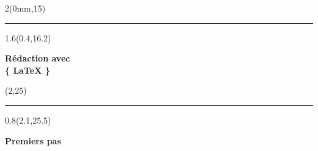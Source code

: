 \begin{frame}[plain]
  \begin{textblock*}{2\TPHorizModule}(0mm,15\TPVertModule)
    \textcolor{white}{\rule{\linewidth}{10\TPVertModule}}
  \end{textblock*}

  \begin{textblock*}{1.6\TPHorizModule}(0.4\TPHorizModule,16.2\TPVertModule)
    \raggedright%
    \titles\bfseries
    \fontsize{20}{20}\selectfont
    Rédaction avec \\
    \rmfamily\mdseries
    \fontsize{22.5}{22.5}\selectfont
    \fontsize{40}{40}\selectfont%
    \{%
    \fontsize{35}{35}\selectfont%
    \LaTeX
    \fontsize{40}{40}\selectfont%
    \}
  \end{textblock*}

  \begin{textblock*}{\TPHorizModule}(2\TPHorizModule,25\TPVertModule)
    \textcolor{white}{\rule{\linewidth}{2\TPVertModule}}
  \end{textblock*}

  \begin{textblock*}{0.8\TPHorizModule}(2.1\TPHorizModule,25.5\TPVertModule)
    \raggedright%
    \titles\bfseries
    \fontsize{11}{11}\selectfont
    Premiers pas
  \end{textblock*}
\end{frame}
\endgroup

